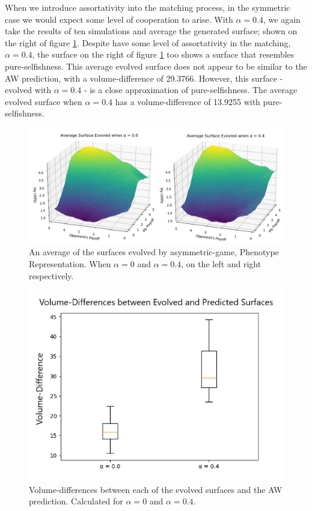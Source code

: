\documentclass[11pt]{book}
\newcommand*{\np}{\par\noindent\newline}
\begin{document}
\np When we introduce assortativity into the matching process, in the symmetric case we would expect some level of cooperation to arise.
With $\alpha = 0.4$, we again take the results of ten simulations and average the generated surface; shown on the right of figure \ref{combined_average_asymmetric_evolved}.
Despite have some level of assortativity in the matching, $\alpha = 0.4$, the surface on the right of figure \ref{combined_average_asymmetric_evolved} too shows a surface that resembles pure-selfishness.
This average evolved surface does not appear to be similar to the AW prediction, with a volume-difference of 29.3766.
However, this surface - evolved with $\alpha = 0.4$ - is a close approximation of pure-selfishness.
The average evolved surface when $\alpha = 0.4$ has a volume-difference of 13.9255 with pure-selfishness.

\begin{figure}
	\centering
	\includegraphics[scale=0.55]{resources/asymmetric_average_evolved_surface_combined.png}
	\caption{An average of the surfaces evolved by asymmetric-game, Phenotype Representation. When $\alpha = 0$ and $\alpha = 0.4$, on the left and right respectively.
	}
	\label{combined_average_asymmetric_evolved}
\end{figure}

\begin{figure}
	\centering
	\includegraphics[scale=0.7]{resources/asymmetric_distance_boxplot_r_00_04.png}
	\caption{Volume-differences between each of the evolved surfaces and the AW prediction. Calculated for $\alpha = 0$ and $\alpha = 0.4$.}
	\label{asymmetric_distance_boxplot_r_00_04}
\end{figure}
\end{document}
